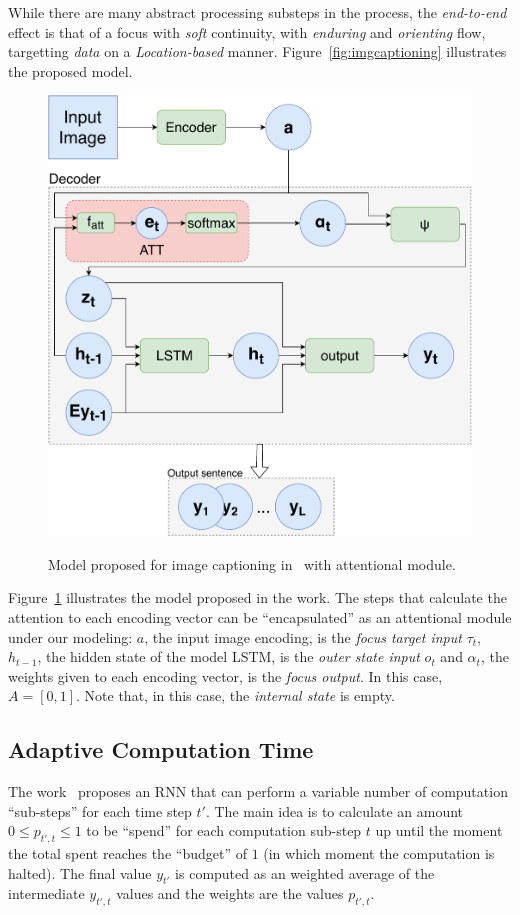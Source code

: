 \documentclass[11pt]{article}
\begin{document}
While there are many abstract processing substeps in the process, the \emph{end-to-end} effect is that of
a focus with \emph{soft} continuity, with \emph{enduring} and \emph{orienting} flow, targetting \emph{data}
on a \emph{Location-based} manner. Figure~\ref{fig:imgcaptioning} illustrates the proposed model.

\begin{figure}[H]
    \centering
    \includegraphics[width=0.7\linewidth]{./img/captioning.pdf}\label{fig:captioning}
    \caption{Model proposed for image captioning in~\cite{ref:show-attend-tell} with attentional module.}
\end{figure}

Figure~\ref{fig:captioning} illustrates the model proposed in the work.
The steps that calculate the attention to each encoding vector can be ``encapsulated'' as
an attentional module under our modeling:
$a$, the input image encoding, is the \emph{focus target input} $\tau_t$,
$h_{t-1}$, the hidden state of the model LSTM, is the \emph{outer state input} $o_t$
and $\alpha_t$, the weights given to each encoding vector, is the \emph{focus output}. In this case, $A = [0, 1]$.
Note that, in this case, the \emph{internal state} is empty.

\subsection{Adaptive Computation Time}
The work~\cite{ref:act} proposes an RNN that can perform a variable number of computation ``sub-steps'' for each time step $t'$.
The main idea is to calculate an amount $0 \le p_{t',t} \le 1$ to be ``spend'' for each computation sub-step $t$ up until the
moment the total spent reaches the ``budget'' of $1$ (in which moment the computation is halted).
The final value $y_{t'}$ is computed as an weighted average of the intermediate $y_{t',t}$ values and the weights are the values
$p_{t',t}$.
\end{document}
